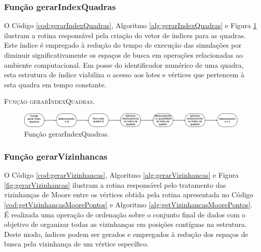 \newpage

\subsubsection{Função gerarIndexQuadras}

O Código \ref{cod:gerarIndexQuadras}, Algoritmo \ref{alg:gerarIndexQuadras} e Figura \ref{fig:gerarIndexQuadras} ilustram a rotina responsável pela criação do vetor de índices para as quadras. Este índice é empregado à redução do tempo de execução das simulações por diminuir significativamente os espaços de busca em operações relacionadas ao ambiente computacional. Em posse do identificador numérico de uma quadra, esta estrutura de índice viabiliza o acesso aos lotes e vértices que pertencem à esta quadra em tempo constante. 



\begin{algorithm}[H]
   \SetAlgoLined   
   
   \caption{\textsc{Função gerarIndexQuadras.}}
   \label{alg:gerarIndexQuadras}
\end{algorithm}

\begin{figure}[H]
  \centering
  \includegraphics[width=1\textwidth]{Figuras/Simula/Fluxos/gerarIndexQuadras.eps}
  \caption{Função gerarIndexQuadras.}
  \label{fig:gerarIndexQuadras}
\end{figure} 

\newpage

\subsubsection{Função gerarVizinhancas}

O Código \ref{cod:gerarVizinhancas}, Algoritmo \ref{alg:gerarVizinhancas} e Figura \ref{fig:gerarVizinhancas} ilustram a rotina responsável pelo tratamento das vizinhanças de Moore entre os vértices obtida pela rotina apresentada no Código \ref{cod:getVizinhancasMoorePontos} e Algoritmo \ref{alg:getVizinhancasMoorePontos}. É realizada uma operação de ordenação sobre o conjunto final de dados com o objetivo de organizar todas as vizinhanças em posições contíguas na estrutura. Deste modo, índices podem ser gerados e empregados à redução dos espaços de busca pela vizinhança de um vértice específico. 

